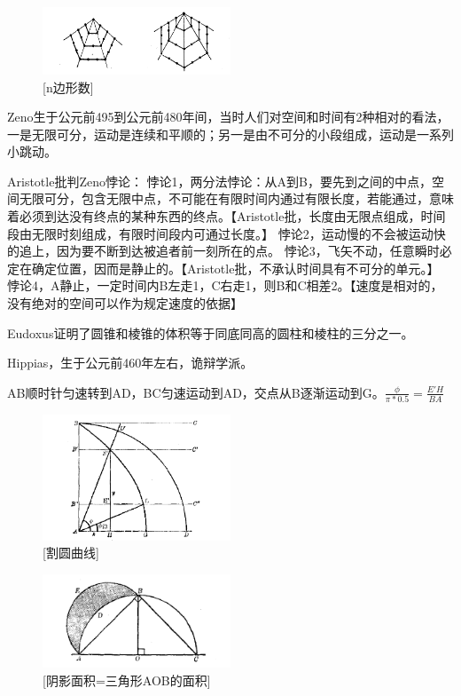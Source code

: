 \begin{figure}[h]
    \centering
    \includegraphics[width=0.5\textwidth]{./resources/古今数学思想-图3_5.png}
    \caption{[n边形数]}
    \label{fig:2}
\end{figure}

Zeno生于公元前495到公元前480年间，当时人们对空间和时间有2种相对的看法，一是无限可分，运动是连续和平顺的；另一是由不可分的小段组成，运动是一系列小跳动。

Aristotle批判Zeno悖论：
悖论1，两分法悖论：从A到B，要先到之间的中点，空间无限可分，包含无限中点，不可能在有限时间内通过有限长度，若能通过，意味着必须到达没有终点的某种东西的终点。【Aristotle批，长度由无限点组成，时间段由无限时刻组成，有限时间段内可通过长度。】
悖论2，运动慢的不会被运动快的追上，因为要不断到达被追者前一刻所在的点。
悖论3，飞矢不动，任意瞬时必定在确定位置，因而是静止的。【Aristotle批，不承认时间具有不可分的单元。】
悖论4，A静止，一定时间内B左走1，C右走1，则B和C相差2。【速度是相对的，没有绝对的空间可以作为规定速度的依据】

Eudoxus证明了圆锥和棱锥的体积等于同底同高的圆柱和棱柱的三分之一。

Hippias，生于公元前460年左右，诡辩学派。


AB顺时针匀速转到AD，BC匀速运动到AD，交点从B逐渐运动到G。$\frac{\phi}{\pi *0.5} = \frac{E'H}{BA}$
\begin{figure}[h]
    \centering
    \includegraphics[width=0.5\textwidth]{./resources/古今数学思想-图3_10.png}
    \caption{[割圆曲线]}
    \label{fig:3}
\end{figure}


\begin{figure}[h]
    \centering
    \includegraphics[width=0.5\textwidth]{./resources/古今数学思想-图3_11.png}
    \caption{[阴影面积=三角形AOB的面积]}
    \label{fig:4}
\end{figure}

